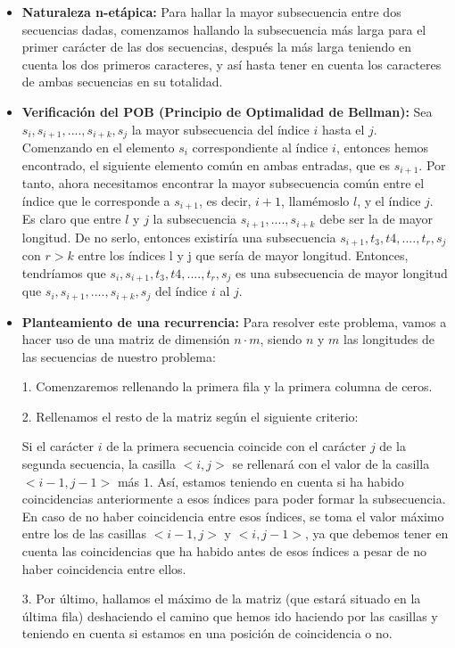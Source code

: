 \documentclass[10pt,a4paper]{article}
\begin{document}
\begin{itemize}
	\item \textbf{Naturaleza n-etápica:} Para hallar la mayor subsecuencia entre dos secuencias dadas, comenzamos hallando la subsecuencia más larga para el primer carácter de las dos secuencias, después la más larga teniendo en cuenta los dos primeros caracteres, y así hasta tener en cuenta los caracteres de ambas secuencias en su totalidad.
	\item \textbf{Verificación del POB (Principio de Optimalidad de Bellman):} Sea $ s_i, s_{i+1},...., s_{i+k}, s_j$ la mayor subsecuencia del índice \(i\) hasta el \(j\).
	Comenzando en el elemento $s_i$ correspondiente al índice $i$, entonces hemos encontrado, el siguiente elemento común en ambas entradas, que es $s_{i+1}$. Por tanto, ahora necesitamos encontrar la mayor subsecuencia común entre el índice que le corresponde a $s_{i+1}$, es decir, $i+1$, llamémoslo $l$, y el índice $j$. Es claro que entre $l$ y $j$ la subsecuencia $s_{i+1},...., s_{i+k}$ debe ser la de mayor longitud. De no serlo, entonces existiría una subsecuencia $s_{i+1}, t_3, t4, ...., t_r, s_j$ con $r>k$ entre los índices l y j que sería de mayor longitud. Entonces, tendríamos que $s_i, s_{i+1}, t_3, t4, ...., t_r, s_j$ es una subsecuencia de mayor longitud que $ s_i, s_{i+1},...., s_{i+k}, s_j$ del índice $i$ al $j$.
	\item \textbf{Planteamiento de una recurrencia:} Para resolver este problema, vamos a hacer uso de una matriz de dimensión $n \cdot m$, siendo $n$ y $m$ las longitudes de las secuencias de nuestro problema: 
	
	1. Comenzaremos rellenando la primera fila y la primera columna de ceros.
	
	2. Rellenamos el resto de la matriz según el siguiente criterio:
	
	Si el carácter $i$ de la primera secuencia coincide con el carácter $j$ de la segunda secuencia, la casilla $<i,j>$ se rellenará con el valor de la casilla $<i-1,j-1>$ más $1$. Así, estamos teniendo en cuenta si ha habido coincidencias anteriormente a esos índices para poder formar la subsecuencia. En caso de no haber coincidencia entre esos índices, se toma el valor máximo entre los de las casillas $<i-1,j>$ y $<i,j-1>$, ya que debemos tener en cuenta las coincidencias que ha habido antes de esos índices a pesar de no haber coincidencia entre ellos.
	
	3. Por último, hallamos el máximo de la matriz (que estará situado en la última fila) deshaciendo el camino que hemos ido haciendo por las casillas y teniendo en cuenta si estamos en una posición de coincidencia o no.
	

\end{itemize}
\end{document}
